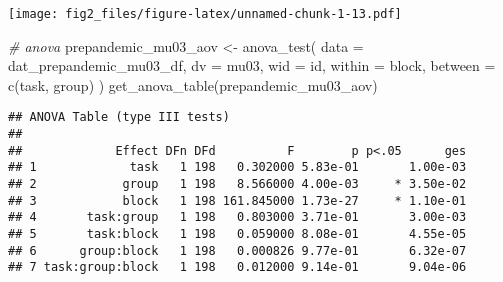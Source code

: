 \documentclass[
]{article}
\newenvironment{Shaded}{\begin{snugshade}}{\end{snugshade}}
\newcommand{\AttributeTok}[1]{\textcolor[rgb]{0.77,0.63,0.00}{#1}}
\newcommand{\CommentTok}[1]{\textcolor[rgb]{0.56,0.35,0.01}{\textit{#1}}}
\newcommand{\FunctionTok}[1]{\textcolor[rgb]{0.00,0.00,0.00}{#1}}
\newcommand{\NormalTok}[1]{#1}
\newcommand{\OtherTok}[1]{\textcolor[rgb]{0.56,0.35,0.01}{#1}}
\begin{document}
\texttt{[image: fig2\_files/figure-latex/unnamed-chunk-1-13.pdf]}

\begin{Shaded}
\begin{Highlighting}[]
\CommentTok{\# anova}
\NormalTok{prepandemic\_mu03\_aov }\OtherTok{\textless{}{-}} \FunctionTok{anova\_test}\NormalTok{(}
  \AttributeTok{data =}\NormalTok{ dat\_prepandemic\_mu03\_df, }\AttributeTok{dv =}\NormalTok{ mu03, }\AttributeTok{wid =}\NormalTok{ id,}
  \AttributeTok{within =}\NormalTok{ block, }\AttributeTok{between =} \FunctionTok{c}\NormalTok{(task, group)}
\NormalTok{)}
\FunctionTok{get\_anova\_table}\NormalTok{(prepandemic\_mu03\_aov)}
\end{Highlighting}
\end{Shaded}

\begin{verbatim}
## ANOVA Table (type III tests)
## 
##             Effect DFn DFd          F        p p<.05      ges
## 1             task   1 198   0.302000 5.83e-01       1.00e-03
## 2            group   1 198   8.566000 4.00e-03     * 3.50e-02
## 3            block   1 198 161.845000 1.73e-27     * 1.10e-01
## 4       task:group   1 198   0.803000 3.71e-01       3.00e-03
## 5       task:block   1 198   0.059000 8.08e-01       4.55e-05
## 6      group:block   1 198   0.000826 9.77e-01       6.32e-07
## 7 task:group:block   1 198   0.012000 9.14e-01       9.04e-06
\end{verbatim}
\end{document}

